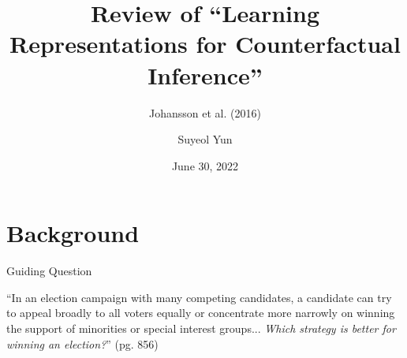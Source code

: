 \documentclass{beamer}
\begin{document}
	\title[Johansson et al. (2016)]{Review of ``Learning Representations for Counterfactual Inference''}
	\subtitle{Johansson et al. (2016)}
	\author[Suyeol]{Suyeol Yun}
	\date{June 30, 2022}
	\frame{\titlepage}
	\section{Background}
	\begin{frame}{Guiding Question}
		\begin{block}{}
			{\large ``In an election campaign with many competing candidates, a candidate can try to appeal broadly to all voters equally or concentrate more narrowly on winning the support of minorities or special interest groups...
				\vskip5mm
				\textit{Which strategy is better for winning an election?}'' (pg. 856)}
		\end{block}
	\end{frame}
\end{document}
